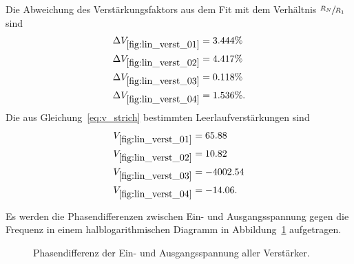 Die Abweichung des Verstärkungsfaktors aus dem Fit mit dem Verhältnis $\sfrac{R_N}{R_1}$
sind
\begin{align*}
  \Delta V_{\ref{fig:lin_verst_01}} &= \num{3.444}\% \\
  \Delta V_{\ref{fig:lin_verst_02}} &= \num{4.417}\% \\
  \Delta V_{\ref{fig:lin_verst_03}} &= \num{0.118}\% \\
  \Delta V_{\ref{fig:lin_verst_04}} &= \num{1.536}\%.
\end{align*}
Die aus Gleichung~\eqref{eq:v_strich} bestimmten Leerlaufverstärkungen sind
\begin{align*}
  V_{\ref{fig:lin_verst_01}} &= \num{65.88} \\
  V_{\ref{fig:lin_verst_02}} &= \num{10.82} \\
  V_{\ref{fig:lin_verst_03}} &= \num{-4002.54} \\
  V_{\ref{fig:lin_verst_04}} &= \num{-14.06}.
\end{align*}

Es werden die Phasendifferenzen zwischen Ein- und Ausgangsspannung gegen die Frequenz
in einem halblogarithmischen Diagramm in Abbildung~\ref{fig:phasendiff} aufgetragen.

\begin{figure}[ht]
  \centering
  
  \caption{Phasendifferenz der Ein- und Ausgangsspannung aller Verstärker.}
  \label{fig:phasendiff}
\end{figure}

